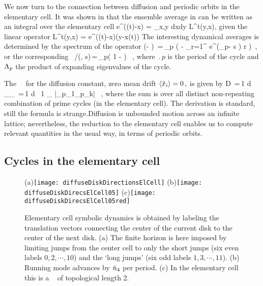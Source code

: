 \documentclass[aps,pre,
                showpacs,
                twocolumn,
                groupedaddress,
                floatfix]{revtex4-1}
\begin{document}

We now turn to the connection between diffusion and periodic orbits in the elementary cell. It was shown in  that the ensemble average in can be written as an integral over the elementary cell
\beq
\langle e^{\beta\cdot(\hx(t)-x)} \rangle
   = \int_{x,y\in \pS} dxdy {\cal L}^t(y,x),
\eeq
given the linear \evOper operator
\beq
{\cal L}^t(y,x) = e^{\beta\cdot(\hx(t)-x)}\delta(y-x(t))
\label{eq-eOper}
\eeq
The interesting dynamical averages is determined by the spectrum of the operator
\beq \det(\eigenvL - \Lop) \,=\,\prod_{p} \exp \left(
  - { \sum_{r=1}^ { e^{(\beta \cdot \hn_p- s
        ) r} \over {} }
  } \right) \,,
or the corresponding \dzeta\
/\zeta(\beta, s)\,=\,\prod_{p}\left( 1 - \frac{e^{(\beta \cdot \hn_p-
      s \period{p})}}{|\ExpaEig_p|} \right) ~,
\label{zeta-diff}
\eeq
where $\period{p}$ is the period of the cycle and $\Lambda_p$ the product of expanding eigenvalues of the cycle. 

The \dzeta\ \cycForm\ for the diffusion constant, zero mean drift
$ \left\langle { \hat{x}_i } \right\rangle = 0 \,, $ is given by
 \beq D \,=\,{1  d}
{ _\zeta \over \expct{\period{}}_\zeta } \,=\,{1
  \over 2 d } \, {1 \over \expct{\period{}}_\zeta} \sumprime
{}
{|\ExpaEig_{p_1}\cdots \ExpaEig_{p_k}|} \, ,
\label{eq-ecDiffCoef}
\eeq
where the sum is over all distinct non-repeating combination of prime cycles (in the elementary cell). The derivation is standard, still the formula is strange.Diffusion is unbounded motion across an infinite lattice; nevertheless, the reduction to the elementary cell enables us to compute relevant quantities in the usual way, in terms of periodic orbits.

\subsection{Cycles in the elementary cell}
\begin{figure}
  \begin{center}
    (a)\texttt{[image: diffuseDiskDirectionsElCell]}
    (b)\texttt{[image: diffuseDiskDirecsElCell05]}
    (c)\texttt{[image: diffuseDiskDirecsElCell05red]}
  \end{center}
  \caption{ Elementary cell symbolic dynamics is obtained by labeling the  translation vectors connecting the center of the current disk to the center of  the next disk. (a) The finite horizon is here imposed by limiting jumps from  the center cell to only the short jumps (six even labels $0, 2,\cdots,10$) and  the `long jumps' (six odd labels $1, 3,\cdots,11$). (b) Running mode   advances by $\hat n_4$ per period. (c) In the elementary cell this is  a \po\  of topological length 2.  }
  \label{fig-diskDirectionsElCell}
\end{figure}
\end{document}
